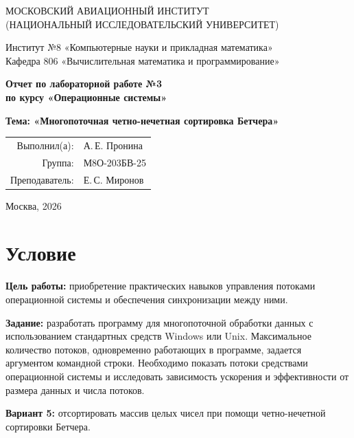 \documentclass[12pt,a4paper,oneside]{article}
\begin{document}
\begin{titlepage}
\begin{center}
\large МОСКОВСКИЙ АВИАЦИОННЫЙ ИНСТИТУТ\\
(НАЦИОНАЛЬНЫЙ ИССЛЕДОВАТЕЛЬСКИЙ УНИВЕРСИТЕТ)
\vspace{20pt}

Институт №8 «Компьютерные науки и прикладная математика»\\
Кафедра 806 «Вычислительная математика и программирование»
\end{center}
\vspace{65pt}
\begin{center}
\large\bfseries Отчет по лабораторной работе №3\\[7pt]
по курсу «Операционные системы»
\end{center}
\vspace{40pt}
\begin{center}
\large\bfseries Тема: «Многопоточная четно-нечетная сортировка Бетчера»
\end{center}
\vfill
\begin{flushright}
\begin{tabular}{rl}
Выполнил(а): & А.\,Е. Пронина \\
Группа: & М8О-203БВ-25 \\
Преподаватель: & Е.\,С. Миронов \\
\end{tabular}
\end{flushright}
\vspace{40pt}
\begin{center}Москва, 2026\end{center}
\end{titlepage}

\section{Условие}
\textbf{Цель работы:} приобретение практических навыков управления потоками операционной системы и обеспечения синхронизации между ними.

\textbf{Задание:} разработать программу для многопоточной обработки данных с использованием стандартных средств Windows или Unix. Максимальное количество потоков, одновременно работающих в программе, задается аргументом командной строки. Необходимо показать потоки средствами операционной системы и исследовать зависимость ускорения и эффективности от размера данных и числа потоков.

\textbf{Вариант 5:} отсортировать массив целых чисел при помощи четно-нечетной сортировки Бетчера.
\end{document}
